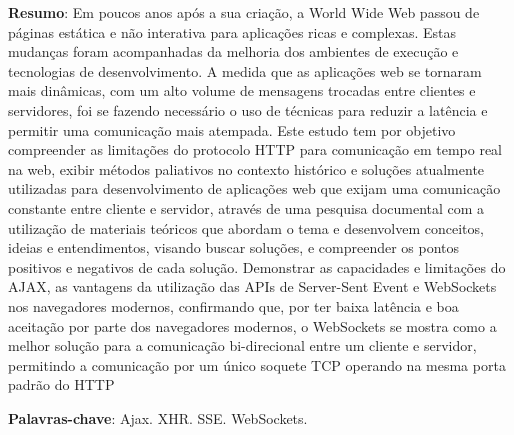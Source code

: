 {
	\small
	\ignorespacesafterend
	\noindent

	\textbf{Resumo}:
	Em poucos anos após a sua criação, a World Wide Web passou de páginas estática e não interativa para aplicações ricas e complexas. Estas mudanças foram acompanhadas da melhoria dos ambientes de execução e tecnologias de desenvolvimento. A medida que as aplicações web se tornaram mais dinâmicas, com um alto volume de mensagens trocadas entre clientes e servidores, foi se fazendo necessário o uso de técnicas para reduzir a latência e permitir uma comunicação mais atempada.
	Este estudo tem por objetivo compreender as limitações do protocolo HTTP para comunicação em tempo real na web, exibir métodos paliativos no contexto histórico e soluções atualmente utilizadas para desenvolvimento de aplicações web que exijam uma comunicação constante entre cliente e servidor,
	através de uma pesquisa documental com a utilização de materiais teóricos que abordam o tema e desenvolvem conceitos, ideias e entendimentos, visando buscar soluções, e compreender os pontos positivos e negativos de cada solução.
	Demonstrar as capacidades e limitações do AJAX, as vantagens da utilização das APIs de Server-Sent Event e WebSockets nos navegadores modernos,
	confirmando que, por ter baixa latência e boa aceitação por parte dos navegadores modernos, o WebSockets se mostra como a melhor solução para a comunicação bi-direcional entre um cliente e servidor, permitindo a comunicação por um único soquete TCP operando na mesma porta padrão do HTTP
	
	\vspace{\onelineskip}

	\textbf{Palavras-chave}: Ajax. XHR. SSE. WebSockets.
}